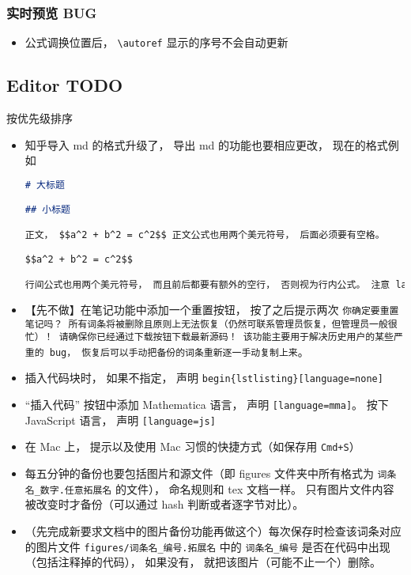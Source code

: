 \subsubsection{实时预览 BUG}
\begin{itemize}
\item 公式调换位置后， \verb|\autoref| 显示的序号不会自动更新
\end{itemize}

\subsection{Editor TODO}
按优先级排序
\begin{itemize}
\item 知乎导入 md 的格式升级了， 导出 md 的功能也要相应更改， 现在的格式例如
\begin{lstlisting}[language=markdown]
# 大标题

## 小标题

正文， $$a^2 + b^2 = c^2$$ 正文公式也用两个美元符号， 后面必须要有空格。

$$a^2 + b^2 = c^2$$

行间公式也用两个美元符号， 而且前后都要有额外的空行， 否则视为行内公式。 注意 latex 代码还是要使用 html 中的而不是 tex 中的。
\end{lstlisting}

\item 【先不做】在笔记功能中添加一个重置按钮， 按了之后提示两次 \verb|你确定要重置笔记吗？ 所有词条将被删除且原则上无法恢复（仍然可联系管理员恢复，但管理员一般很忙）！ 请确保你已经通过下载按钮下载最新源码！ 该功能主要用于解决历史用户的某些严重的 bug， 恢复后可以手动把备份的词条重新逐一手动复制上来|。

\item 插入代码块时， 如果不指定， 声明 \verb`begin{lstlisting}[language=none]`

\item “插入代码” 按钮中添加 Mathematica 语言， 声明 \verb`[language=mma]`。 按下 JavaScript 语言， 声明 \verb|[language=js]|

\item 在 Mac 上， 提示以及使用 Mac 习惯的快捷方式（如保存用 \verb|Cmd+S|）

\item 每五分钟的备份也要包括图片和源文件（即 figures 文件夹中所有格式为 \verb|词条名_数字.任意拓展名| 的文件）， 命名规则和 tex 文档一样。 只有图片文件内容被改变时才备份（可以通过 hash 判断或者逐字节对比）。

\item （先完成新要求文档中的图片备份功能再做这个）每次保存时检查该词条对应的图片文件 \verb|figures/词条名_编号.拓展名| 中的 \verb|词条名_编号| 是否在代码中出现（包括注释掉的代码）， 如果没有， 就把该图片（可能不止一个）删除。


\end{itemize}
